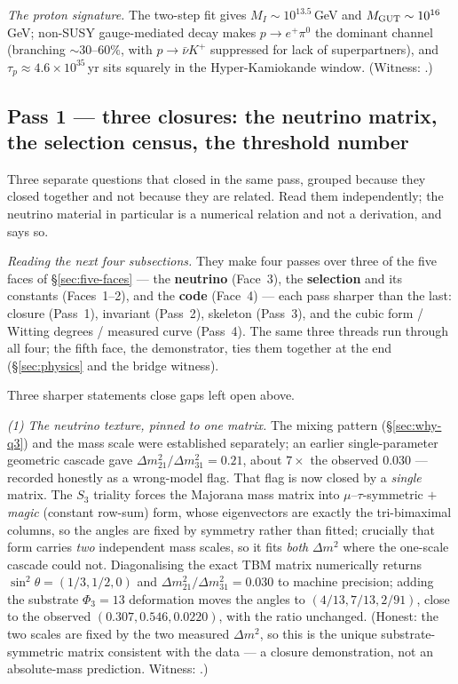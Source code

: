 \documentclass[11pt]{article}
\begin{document}
\emph{The proton signature.} The two-step fit gives $M_I\sim10^{13.5}$\,GeV and
$M_{\rm GUT}\sim10^{16}$\,GeV; non-SUSY gauge-mediated decay makes
$p\to e^+\pi^0$ the dominant channel (branching $\sim30$--$60\%$, with
$p\to\bar\nu K^+$ suppressed for lack of superpartners), and
$\tau_p\approx4.6\times10^{35}$\,yr sits squarely in the Hyper-Kamiokande window.
(Witness: .)

\subsection{Pass 1 --- three closures: the neutrino matrix, the selection census, the threshold number}

\begin{plainbox}
Three separate questions that closed in the same pass, grouped because they closed
together and not because they are related. Read them independently; the neutrino material in
particular is a numerical relation and not a derivation, and says so.
\end{plainbox}

\label{sec:three-closures}

\emph{Reading the next four subsections.} They make four passes over three of the
five faces of \S\ref{sec:five-faces} --- the \textbf{neutrino} (Face~3), the
\textbf{selection} and its constants (Faces~1--2), and the \textbf{code} (Face~4) ---
each pass sharper than the last: closure (Pass~1), invariant (Pass~2), skeleton
(Pass~3), and the cubic form / Witting degrees / measured curve (Pass~4). The same
three threads run through all four; the fifth face, the demonstrator, ties them
together at the end (\S\ref{sec:physics} and the bridge witness).

Three sharper statements close gaps left open above.

\emph{(1) The neutrino texture, pinned to one matrix.} The mixing pattern
(\S\ref{sec:why-q3}) and the mass scale were established separately; an earlier
single-parameter geometric cascade gave $\Delta m^2_{21}/\Delta m^2_{31}=0.21$,
about $7\times$ the observed $0.030$ --- recorded honestly as a wrong-model flag.
That flag is now closed by a \emph{single} matrix. The $S_3$ triality forces the
Majorana mass matrix into $\mu$--$\tau$-symmetric $+$ \emph{magic} (constant
row-sum) form, whose eigenvectors are exactly the tri-bimaximal columns, so the
angles are fixed by symmetry rather than fitted; crucially that form carries
\emph{two} independent mass scales, so it fits \emph{both} $\Delta m^2$ where the
one-scale cascade could not. Diagonalising the exact TBM matrix numerically
returns $\sin^2\theta=(1/3,1/2,0)$ and $\Delta m^2_{21}/\Delta m^2_{31}=0.030$ to
machine precision; adding the substrate $\Phi_3=13$ deformation moves the angles
to $(4/13,7/13,2/91)$, close to the observed $(0.307,0.546,0.0220)$, with the ratio
unchanged. (Honest: the two scales are fixed by the two measured $\Delta m^2$, so
this is the unique substrate-symmetric matrix consistent with the data --- a
closure demonstration, not an absolute-mass prediction. Witness:
.)
\end{document}
